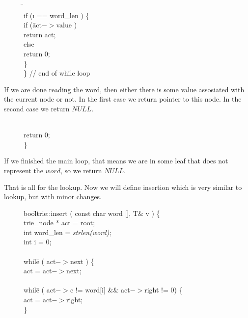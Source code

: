 \documentclass[a4paper,12pt]{article}
\begin{document}
\begin{figure}[!h]
\begin{tabbing}
\quad \quad \= \quad \quad \= \\
\>\>    if (\= i == word\_len ) \{ \\
\>\>\>      if (\= act$->$value ) \\
\>\>\>\>        return act; \\
\>\>\>      else \\
\>\>\>\>        return 0; \\
\>\>    \} \\
\>  \} // end of while loop \\
\end{tabbing}
\end{figure}

\newpage

\noindent If we are done reading the word, then either there is some value assosiated with the current node or not. In the first case we return pointer to this node. In the second case we return $NULL$.

\begin{figure}[!h]
\begin{tabbing}
\quad \quad \= \\
\>  return 0; \\
\} \\
\end{tabbing}
\end{figure}

\noindent If we finished the main loop, that means we are in some leaf that does not represent the $word$, so we return $NULL$.

That is all for the lookup. Now we will define insertion which is very similar to lookup, but with minor changes. 

\begin{figure}[!h]
\begin{tabbing}
bool\= \quad trie::insert ( const char word [], T\& v ) \{ \\
\>  trie\_node * act = root; \\
\>  int word\_len = \emph{strlen(word)}; \\
\>  int i = 0; \\
\> \\
\>  whil\=e ( act$->$next ) \{ \\
\>\>    act = act$->$next; \\
\>\> \\
\>\>   whil\=e ( act$->$c != word[i] \&\& act$->$right != 0) \{ \\
\>\>\>    act = act$->$right; \\
\>\>    \} \\
\end{tabbing}
\end{figure}
\end{document}
